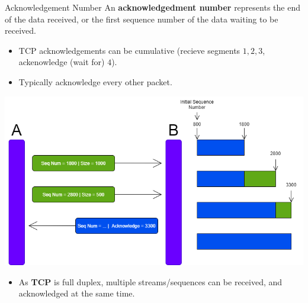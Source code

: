 \begin{definitionbox}{Acknowledgement Number}
    An \textbf{acknowledgedment number} represents the end of the data received, or the first sequence number  of the data waiting to be received.
    \begin{itemize}
        \setlength\itemsep{0em}
        \item TCP acknowledgements can be cumulative (recieve segments $1,2,3$, ackenowledge (wait for) $4$).
        \item Typically acknowledge every other packet.
    \end{itemize}
    \begin{center}\includegraphics[width=\textwidth]{transport_layer/images/tcp acknowledgement.png}\end{center}
    \begin{itemize}
        \setlength\itemsep{0em}
        \item As \textbf{TCP} is full duplex, multiple streams/sequences can be received, and acknowledged at the same time.
    \end{itemize}
\end{definitionbox}

